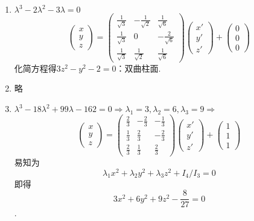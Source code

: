 \documentclass[UTF8]{ctexart}
\begin{document}
\begin{enumerate}
\begin{enumerate}[(1)]
\item $\lambda^3-2\lambda^2-3\lambda=0$
$$\left(\begin{array}{c}x\\y\\z\end{array}\right)=\left(\begin{array}{ccc}\displaystyle\frac{1}{\sqrt{3}}&\displaystyle-\frac{1}{\sqrt{2}}&\displaystyle\frac{1}{\sqrt{6}}\\\displaystyle\frac{1}{\sqrt{3}}&0&\displaystyle-\frac{2}{\sqrt{6}}\\\displaystyle\frac{1}{\sqrt{3}}&\displaystyle\frac{1}{\sqrt{2}}&\displaystyle\frac{1}{\sqrt{6}}\end{array}\right)\left(\begin{array}{c}x'\\y'\\z'\end{array}\right)+\left(\begin{array}{c}0\\0\\0\end{array}\right)$$
化简方程得$3z^2-y^2-2=0$：双曲柱面.

\item 略

\item $\lambda^3-18\lambda^2+99\lambda-162=0\Rightarrow\lambda_1=3,\lambda_2=6,\lambda_3=9\Rightarrow$
$$\left(\begin{array}{c}x\\y\\z\end{array}\right)=\left(\begin{array}{ccc}\displaystyle\frac{2}{3}&\displaystyle-\frac{2}{3}&\displaystyle-\frac{1}{3}\\\displaystyle\frac{1}{3}&\displaystyle\frac{2}{3}&\displaystyle-\frac{2}{3}\\\displaystyle\frac{2}{3}&\displaystyle\frac{1}{3}&\displaystyle\frac{2}{3}\end{array}\right)\left(\begin{array}{c}x'\\y'\\z'\end{array}\right)+\left(\begin{array}{c}1\\1\\1\end{array}\right)$$
易知为$$\lambda_1x^2+\lambda_2y^2+\lambda_3z^2+I_4/I_3=0$$
即得$$3x^2+6y^2+9z^2-\displaystyle\frac{8}{27}=0$$.


\end{enumerate}
\end{enumerate}
\end{document}
